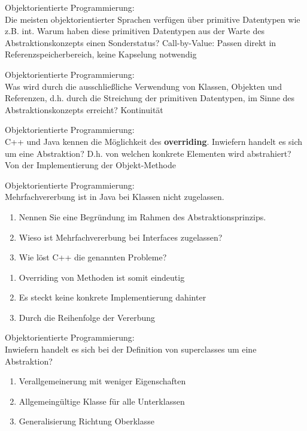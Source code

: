 \begin{card}
	Objektorientierte Programmierung:\\
	Die meisten objektorientierter Sprachen verfügen über primitive Datentypen wie z.B. int. Warum haben diese primitiven Datentypen aus der Warte des Abstraktionskonzepts einen Sonderstatus?
	\hr
	Call-by-Value: Passen direkt in Referenzspeicherbereich, keine Kapselung notwendig
\end{card}

\begin{card}
	Objektorientierte Programmierung:\\
	Was wird durch die ausschließliche Verwendung von Klassen, Objekten und Referenzen, d.h. durch die Streichung der primitiven Datentypen, im Sinne des Abstraktionskonzepts erreicht?
	\hr
	Kontinuität
\end{card}

\begin{card}
	Objektorientierte Programmierung:\\
	C++ und Java kennen die Möglichkeit des \textbf{overriding}. Inwiefern handelt es sich um eine Abstraktion? D.h. von welchen konkrete Elementen wird abstrahiert? 
	\hr
	Von der Implementierung der Objekt-Methode
\end{card}

\begin{card}
	Objektorientierte Programmierung:\\
	Mehrfachvererbung ist in Java bei Klassen nicht zugelassen. 
	\begin{enumerate}
	\item Nennen Sie eine Begründung im Rahmen des Abstraktionsprinzips.
	\item Wieso ist Mehrfachvererbung bei Interfaces zugelassen?
	\item Wie löst C++ die genannten Probleme?
	\end{enumerate}
	\hr
	\begin{enumerate}
	\item Overriding von Methoden ist somit eindeutig
	\item Es steckt keine konkrete Implementierung dahinter
	\item Durch die Reihenfolge der Vererbung
	\end{enumerate}
\end{card}

\begin{card}
	Objektorientierte Programmierung:\\
	Inwiefern handelt es sich bei der Definition von superclasses um eine Abstraktion?
	\hr
	\begin{enumerate}
	\item Verallgemeinerung mit weniger Eigenschaften
	\item Allgemeingültige Klasse für alle Unterklassen
	\item Generalisierung Richtung Oberklasse
	\end{enumerate}
\end{card}

